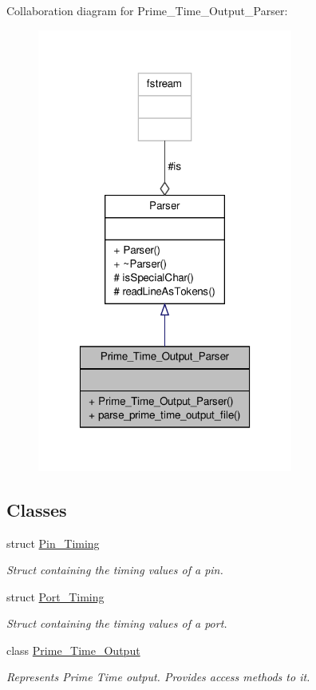 Collaboration diagram for Prime\-\_\-\-Time\-\_\-\-Output\-\_\-\-Parser\-:\nopagebreak
\begin{figure}[H]
\begin{center}
\leavevmode
\includegraphics[width=238pt]{classPrime__Time__Output__Parser__coll__graph}
\end{center}
\end{figure}
\subsection*{Classes}
\begin{DoxyCompactItemize}
\item 
struct \hyperlink{structPrime__Time__Output__Parser_1_1Pin__Timing}{Pin\-\_\-\-Timing}
\begin{DoxyCompactList}\small\item\em Struct containing the timing values of a pin. \end{DoxyCompactList}\item 
struct \hyperlink{structPrime__Time__Output__Parser_1_1Port__Timing}{Port\-\_\-\-Timing}
\begin{DoxyCompactList}\small\item\em Struct containing the timing values of a port. \end{DoxyCompactList}\item 
class \hyperlink{classPrime__Time__Output__Parser_1_1Prime__Time__Output}{Prime\-\_\-\-Time\-\_\-\-Output}
\begin{DoxyCompactList}\small\item\em Represents Prime Time output. Provides access methods to it. \end{DoxyCompactList}\end{DoxyCompactItemize}
